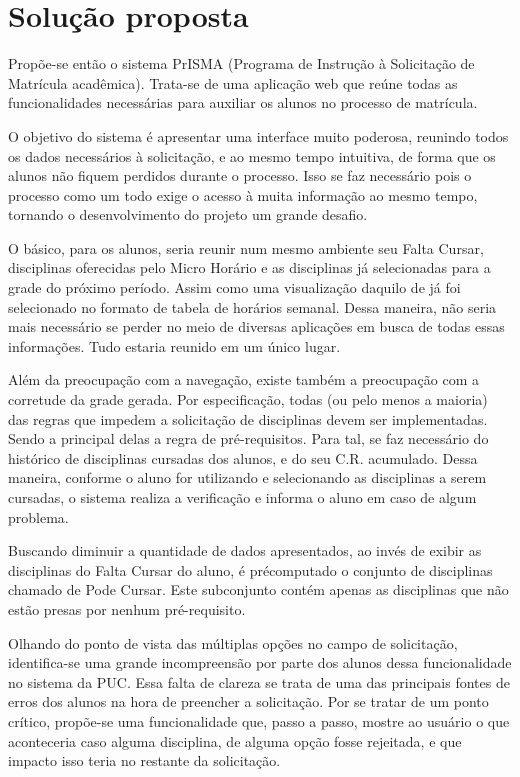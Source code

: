 \documentclass[graduacao,brazil]{ThesisPUC}
\begin{document}

\chapter{Solução proposta}

Propõe-se então o sistema PrISMA (Programa de Instrução à Solicitação de Matrícula acadêmica). Trata-se de uma aplicação web que reúne todas as funcionalidades necessárias para auxiliar os alunos no processo de matrícula.

O objetivo do sistema é apresentar uma interface muito poderosa, reunindo todos os dados necessários à solicitação, e ao mesmo tempo intuitiva, de forma que os alunos não fiquem perdidos durante o processo. Isso se faz necessário pois o processo como um todo exige o acesso à muita informação ao mesmo tempo, tornando o desenvolvimento do projeto um grande desafio.

O básico, para os alunos, seria reunir num mesmo ambiente seu Falta Cursar, disciplinas oferecidas pelo Micro Horário e as disciplinas já selecionadas para a grade do próximo período. Assim como uma visualização daquilo de já foi selecionado no formato de tabela de horários semanal. Dessa maneira, não seria mais necessário se perder no meio de diversas aplicações em busca de todas essas informações. Tudo estaria reunido em um único lugar.

Além da preocupação com a navegação, existe também a preocupação com a corretude da grade gerada. Por especificação, todas (ou pelo menos a maioria) das regras que impedem a solicitação de disciplinas devem ser implementadas. Sendo a principal delas a regra de pré-requisitos. Para tal, se faz necessário do histórico de disciplinas cursadas dos alunos, e do seu C.R. acumulado. Dessa maneira, conforme o aluno for utilizando e selecionando as disciplinas a serem cursadas, o sistema realiza a verificação e informa o aluno em caso de algum problema.

Buscando diminuir a quantidade de dados apresentados, ao invés de exibir as disciplinas do Falta Cursar do aluno, é précomputado o conjunto de disciplinas chamado de Pode Cursar. Este subconjunto contém apenas as disciplinas que não estão presas por nenhum pré-requisito. 

Olhando do ponto de vista das múltiplas opções no campo de solicitação, identifica-se uma grande incompreensão por parte dos alunos dessa funcionalidade no sistema da PUC. Essa falta de clareza se trata de uma das principais fontes de erros dos alunos na hora de preencher a solicitação. Por se tratar de um ponto crítico, propõe-se uma funcionalidade que, passo a passo, mostre ao usuário o que aconteceria caso alguma disciplina, de alguma opção fosse rejeitada, e que impacto isso teria no restante da solicitação.
\end{document}
